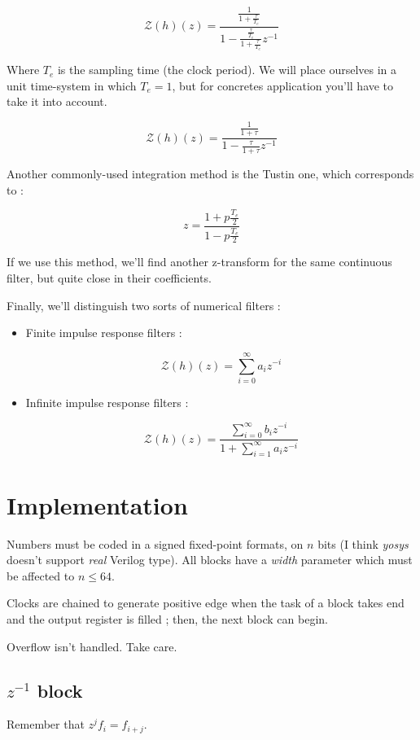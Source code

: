 \documentclass{report}
\begin{document}
\[
\mathcal{Z}(h)(z) = \frac{\frac{1}{1+\frac{\tau}{T_e}}}{1 - \frac{\frac{\tau}{T_e}}{1+\frac{\tau}{T_e}}z^{-1}}
\]

Where $T_e$ is the sampling time (the clock period). We will place ourselves in a unit time-system in which $T_e=1$, but for concretes application you'll have to take it into account.

\[
\mathcal{Z}(h)(z) = \frac{\frac{1}{1+\tau}}{1 - \frac{\tau}{1+\tau}z^{-1}}
\]

Another commonly-used integration method is the Tustin one, which corresponds to :

\[
z = \frac{1+p\frac{T_e}{2}}{1-p\frac{T_e}{2}}
\]

If we use this method, we'll find another z-transform for the same continuous filter, but quite close in their coefficients.

Finally, we'll distinguish two sorts of numerical filters :

\begin{itemize}
\item Finite impulse response filters :

\[
\mathcal{Z}(h)(z) = \sum_{i=0}^\infty a_i z^{-i}
\]

\item Infinite impulse response filters :

\[
\mathcal{Z}(h)(z) = \frac{\sum_{i=0}^\infty b_i z^{-i}}{1+\sum_{i=1}^\infty a_i z^{-i}}
\]

\end{itemize}

\section*{Implementation}

Numbers must be coded in a signed fixed-point formats, on $n$ bits (I think \emph{yosys} doesn't support \emph{real} Verilog type). All blocks have a \emph{width} parameter which must be affected to $n\leq 64$.

Clocks are chained to generate positive edge when the task of a block takes end and the output register is filled ; then, the next block can begin.

Overflow isn't handled. Take care.

\subsection*{$z^{-1}$ block}

Remember that $z^j f_i = f_{i+j}$.
\end{document}

